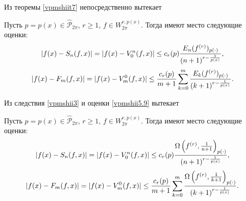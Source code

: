 Из теоремы \ref{vpmshiit7} непосредственно вытекает


\begin{corollary}\label{vpmshii3}
Пусть  $p=p(x)\in \hat{\mathcal{  P}}_{2\pi}$, $r\ge1$, $f\in W^{r,p(x)}_{2\pi}$. Тогда имеют место следующие оценки:
$$
|f(x)-S_n(f,x)|= |f(x)-V_0^n(f,x)|\le c_r(p){E_n(f^{(r)})_{p(\cdot)}\over (n+1)^{r-{\frac{1}{p(x)}}}},
$$
$$
 |f(x)-F_m(f,x)| =   |f(x)-V_m^0(f,x)|\le \frac{c_r(p)}{m+1}\sum_{k=0}^{m}{E_k(f^{(r)})_{p(\cdot)}\over (k+1)^{r-{\frac{1}{p(x)}}}} .
$$
 \end{corollary}
 Из следствия \ref{vpmshii3} и оценки \eqref{vpmshii5.9} вытекает

\begin{corollary}\label{vpmshii4}
Пусть  $p=p(x)\in \hat{\mathcal{  P}}_{2\pi}$, $r\ge1$, $f\in W^{r,p(x)}_{2\pi}$. Тогда имеют место следующие оценки:
$$
|f(x)-S_n(f,x)|= |f(x)-V_0^n(f,x)|\le c_r(p){\Omega\left(f^{(r)},\frac1{n+1}\right)_{p(\cdot)}\over (n+1)^{r-{\frac{1}{p(x)}}}},
$$
$$
 |f(x)-F_m(f,x)| =   |f(x)-V_m^0(f,x)|\le \frac{c_r(p)}{m+1}\sum_{k=0}^{m}{\Omega\left(f^{(r)},\frac1{k+1}\right)_{p(\cdot)}\over (k+1)^{r-{\frac{1}{p(x)}}}} .
$$
 \end{corollary}













